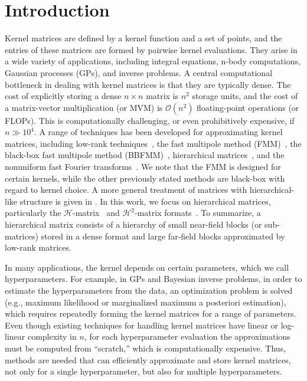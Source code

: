 \documentclass[final,3p,times]{elsarticle}
\newcommand{\mc}[1]{\mathcal{#1}}
\begin{document}
\section{Introduction} \label{sec:Introduction}

Kernel matrices are defined by a kernel function and a set of points, and the entries of these matrices are formed by pairwise kernel evaluations. They arise in a wide variety of applications, including integral equations, n-body computations, Gaussian processes (GPs), and inverse problems. A central computational bottleneck in dealing with kernel matrices is that they are typically dense. The cost of explicitly storing a dense $n\times n$ matrix is $n^2$ storage units, and the cost of a matrix-vector multiplication (or MVM) is $\mc{O}(n^2)$ floating-point operations (or FLOPs). This is computationally challenging, or even prohibitively expensive, if $n \gg 10^4$. A range of techniques has been developed for approximating kernel matrices, including low-rank techniques~\cite{rahimi2007random,williams2000using,fine2001efficient}, the fast multipole method (FMM)~\cite{greengard1987fast}, the black-box fast multipole method (BBFMM)~\cite{fong2009black}, hierarchical matrices~\cite{borm2003introduction, hackbusch2015hierarchical, Ballani2016}, and the nonuniform fast Fourier transforms~\cite{greengard2004accelerating}. 
We note that the FMM is designed for certain kernels, while the other previously stated methods are black-box with regard to kernel choice. A more general treatment of matrices with hierarchical-like structure is given in \cite{Ballani2016}. In this work, we  focus on hierarchical matrices, particularly the $\mc{H}$-matrix~\cite{hackbusch1999sparse,hackbusch2000sparse} and $\mc{H}^2$-matrix formats~\cite{hackbusch2002data}. To summarize, a hierarchical matrix consists of a hierarchy of small near-field blocks (or sub-matrices) stored in a dense format and large far-field blocks approximated by low-rank matrices.


In many applications, the kernel depends on certain parameters, which we call hyperparameters. For example, in GPs and Bayesian inverse problems, in order to estimate the hyperparameters from the data, an optimization problem is solved (e.g., maximum likelihood or marginalized maximum a posteriori estimation), which requires repeatedly forming the kernel matrices for a range of parameters. Even though existing techniques for handling kernel matrices have linear or log-linear complexity in $n$, for each hyperparameter evaluation the approximations must be computed from ``scratch,'' which is computationally expensive. Thus, methods are needed that   can efficiently approximate and store kernel matrices, not only for a single hyperparameter, but also  for multiple hyperparameters.
\end{document}
